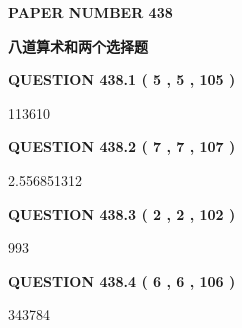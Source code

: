\documentclass{ctexart}
\begin{document}
   
   
   
\newpage 
\setcounter{page}{ 
   438001 } 
   
   
   
   
 {\textbf{ \Large{ PAPER NUMBER  438  }}}
   
   
\vspace{0.2in}
   
   
   
   
   
   
 \vspace{0.2in}
{\LARGE {\textbf{ 八道算术和两个选择题}}}
   
   
  
\vspace{0.2in}
  
{\textbf{\Large{QUESTION
438.1 
 ( 5 , 5 , 105 )
}}}
  
  
 
 
\noindent{}

113610
 
 
  
\vspace{0.2in}
  
{\textbf{\Large{QUESTION
438.2 
 ( 7 , 7 , 107 )
}}}
  
  
 
 
\noindent{}

2.556851312
 
 
  
\vspace{0.2in}
  
{\textbf{\Large{QUESTION
438.3 
 ( 2 , 2 , 102 )
}}}
  
  
 
 
\noindent{}

993
 
 
  
\vspace{0.2in}
  
{\textbf{\Large{QUESTION
438.4 
 ( 6 , 6 , 106 )
}}}
  
  
 
 
\noindent{}

343784
 
\end{document}
